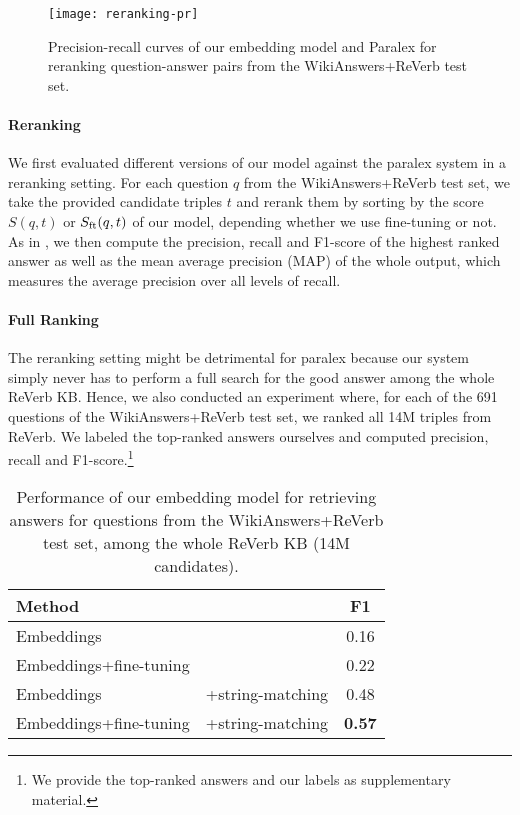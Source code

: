 \documentclass[runningheads,a4paper]{llncs}
\newcommand{\Sft}[2]{S_{{\rm ft}}(#1,#2)}
\newcommand{\rv}{{\sc ReVerb}\xspace}
\newcommand{\wkrv}{{\sc WikiAnswers+ReVerb}\xspace}
\begin{document}
\begin{figure}[t]
\begin{center}
\centerline{\texttt{[image: reranking-pr]}}
\caption{Precision-recall curves of our embedding model and Paralex \cite{paralex} for reranking question-answer pairs from the \wkrv test set.}
\label{fig:pr}
\end{center}
\vskip -0.2in
\end{figure} 

\paragraph{Reranking}

We first evaluated different versions of our model against the {\sc paralex} system in a reranking setting.  
For each question $q$ from the \wkrv test set, we take the provided candidate triples $t$ and rerank them by sorting by the score $S(q,t)$ or $\Sft{q}{t}$ of our model, depending whether we use fine-tuning or not. 
As in \cite{paralex}, we then compute the precision, recall and F1-score of the highest ranked answer as well as the mean average precision (MAP) of the whole output, which measures the average precision over all levels of recall.


\paragraph{Full Ranking}

The reranking setting might be detrimental for {\sc paralex} because our system simply never has to perform a full search for the good answer among the whole \rv KB.
Hence, we also conducted an experiment where, for each of the 691 questions of the \wkrv test set, we ranked all 14M triples from \rv.
We labeled the top-ranked answers ourselves and computed precision, recall and F1-score.\footnote{We provide the top-ranked answers and our labels as supplementary material.}



\begin{table}
\caption{Performance of our embedding model for retrieving answers for questions from the \wkrv test set, among the whole \rv KB (14M candidates).}
\label{tab:resfull}
\vskip -0.1in
\begin{center}
\begin{small}
\begin{tabular}{|l@{}l|c|}
\hline
{\bf Method} && {\bf F1} \\
\hline
Embeddings && 0.16  \\
Embeddings+fine-tuning && 0.22 \\
\hline
Embeddings &+string-matching & 0.48 \\
Embeddings+fine-tuning &+string-matching &  {\bf 0.57} \\
\hline
\end{tabular}
\end{small}
\end{center}
\vskip -0.1in
\end{table}
\end{document}
